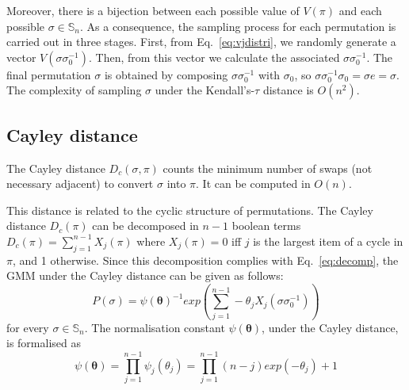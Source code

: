 \documentclass[conference]{IEEEtran}
\begin{document}
Moreover, there is a bijection between each possible value of $V(\pi)$ and each possible $\sigma \in \mathbb{S}_n$. As a consequence, the sampling process for each permutation is carried out in three stages. First, from Eq.~\ref{eq:vjdistri}, we randomly generate a vector $V(\sigma \sigma_0^{-1})$. Then, from this vector we calculate the associated $\sigma \sigma_0^{-1}$. The final permutation $\sigma$ is obtained by composing $\sigma \sigma_0^{-1}$ with $\sigma_0$, so  $\sigma \sigma_0^{-1} \sigma_0 = \sigma e= \sigma$. The complexity of sampling $\sigma$ under the Kendall's-$\tau$ distance is $O(n^2)$.

\subsection{Cayley distance} %
The Cayley distance $D_c(\sigma, \pi)$ counts the minimum number of swaps (not necessary adjacent) to convert $\sigma$ into $\pi$. It can be computed in $O(n)$. 

This distance is related to the cyclic structure of permutations. The Cayley distance $D_c(\pi)$ can be decomposed in $n-1$ boolean terms $D_c(\pi) = \sum_{j=1}^{n-1} X_j(\pi)$ where $X_j(\pi)=0$ iff $j$ is the largest item of a cycle in $\pi$, and 1 otherwise. Since this decomposition complies with Eq.~\ref{eq:decomp}, the GMM under the Cayley distance can be given as follows:
\begin{equation}
P(\sigma) =  \psi(\boldsymbol \theta)^{-1} exp(\sum_{j=1}^{n-1}-\theta_j X_j(\sigma \sigma_0^{-1})) 
\label{eq:mallowsX}
\end{equation}
for every $\sigma \in \mathbb{S}_n$. The normalisation constant $\psi(\boldsymbol \theta)$, under the Cayley distance, is formalised as
\begin{equation}
\psi(\boldsymbol{\theta})= \prod_{j=1}^{n-1} \psi_j(\theta_j) =\prod_{j=1}^{n-1} (n-j) exp(-\theta_j ) +1   
\label{eq:psij_cayley}
\end{equation}

\end{document}
